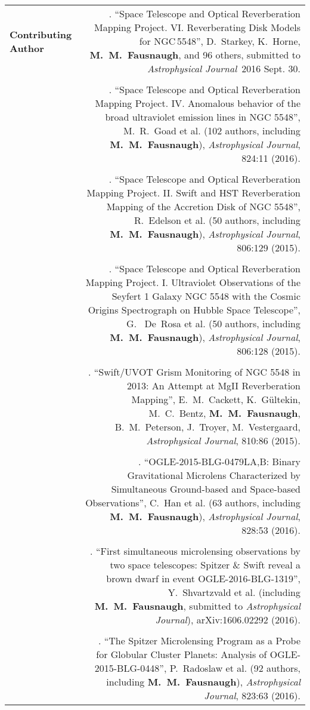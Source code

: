 \documentclass[letterpaper,11pt]{article}
\newcounter{pubs}
\newcommand{\publication}[1]{ {\raggedright\stepcounter{pubs}\thepubs.\,\,#1}}
\newcommand{\apj}{\textit{Astrophysical Journal}}
\begin{document}
\begin{longtable}{LR}
\textbf{Contributing Author}
&\publication{``Space Telescope and Optical Reverberation Mapping Project. VI. Reverberating Disk Models for NGC\,5548'',
  D.~Starkey, K.~Horne, \textbf{M.~M.~Fausnaugh}, and 96 others, submitted to \apj\ 2016 Sept. 30.}\\
\\
&\publication{``Space Telescope and Optical Reverberation Mapping Project. IV. Anomalous behavior of the broad ultraviolet emission lines in NGC 5548'', 
M.~R.~Goad et al. (102 authors, including \textbf{M.~M.~Fausnaugh}), \apj, 824:11 (2016).}\\
\\
&\publication{``Space Telescope and Optical Reverberation Mapping Project. II. Swift and HST Reverberation Mapping of the Accretion Disk of NGC 5548'',
R.~Edelson et al. (50 authors, including \textbf{M.~M.~Fausnaugh}), \apj, 806:129 (2015).}\\
\\    
&\publication{``Space Telescope and Optical Reverberation Mapping Project. I. Ultraviolet Observations of the  Seyfert 1 Galaxy NGC 5548 with the Cosmic Origins Spectrograph on Hubble Space Telescope'',
G.~ De~Rosa et al. (50 authors, including \textbf{M.~M.~Fausnaugh}), \apj, 806:128 (2015).}\\
\\
&\publication{``Swift/UVOT Grism Monitoring of NGC 5548 in 2013: An Attempt at MgII 
  Reverberation Mapping'',  E.~M.~Cackett, K.~G\"ultekin, M.~C.~Bentz, \textbf{M.~M.~Fausnaugh}, B.~M.~Peterson, J.~Troyer, M.~Vestergaard, \apj, 810:86 (2015).}\\
\\
&\publication{``OGLE-2015-BLG-0479LA,B: Binary Gravitational Microlens Characterized by Simultaneous Ground-based and Space-based Observations'', 
C.~Han et al. (63 authors, including \textbf{M.~M.~Fausnaugh}), \apj, 828:53 (2016).}\\
\\
&\publication{``First simultaneous microlensing observations by two space telescopes: Spitzer \& Swift reveal a brown dwarf in event OGLE-2016-BLG-1319'', 
Y.~Shvartzvald et al. (including \textbf{M.~M.~Fausnaugh}, submitted to \apj), arXiv:1606.02292 (2016).}\\
\\
&\publication{``The Spitzer Microlensing Program as a Probe for Globular Cluster Planets:  Analysis of OGLE-2015-BLG-0448'', 
P.~Radoslaw et al. (92 authors, including \textbf{M.~M.~Fausnaugh}), \apj, 823:63 (2016).}\\

\end{longtable}
\end{document}
